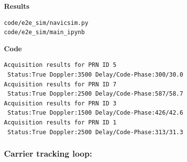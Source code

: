 \textbf{Results}
\begin{lstlisting}
code/e2e_sim/navicsim.py
code/e2e_sim/main_ipynb
\end{lstlisting}
\textbf{Code}
\begin{lstlisting}
Acquisition results for PRN ID 5
 Status:True Doppler:3500 Delay/Code-Phase:300/30.0
Acquisition results for PRN ID 7
 Status:True Doppler:2500 Delay/Code-Phase:587/58.7
Acquisition results for PRN ID 3
 Status:True Doppler:1500 Delay/Code-Phase:426/42.6
Acquisition results for PRN ID 1
 Status:True Doppler:2500 Delay/Code-Phase:313/31.3
\end{lstlisting}


\subsubsection{Carrier tracking loop:}

